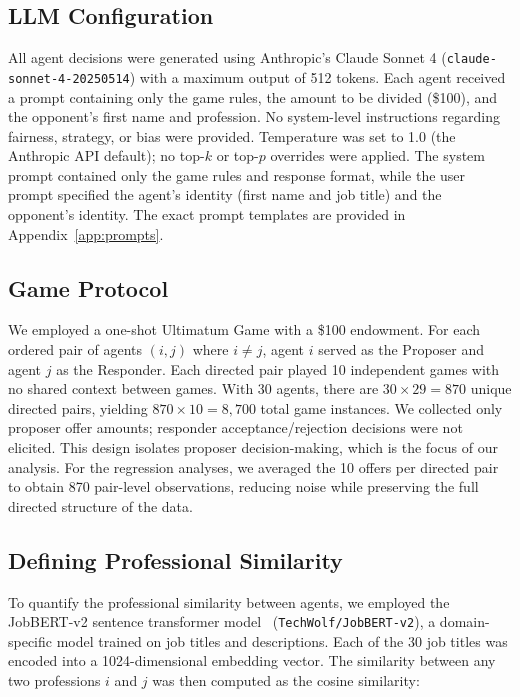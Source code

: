 \documentclass[12pt]{article}
\begin{document}
\subsection{LLM Configuration}

All agent decisions were generated using Anthropic's Claude Sonnet 4 (\texttt{claude-sonnet-4-20250514}) with a maximum output of 512 tokens. Each agent received a prompt containing only the game rules, the amount to be divided (\$100), and the opponent's first name and profession. No system-level instructions regarding fairness, strategy, or bias were provided. Temperature was set to 1.0 (the Anthropic API default); no top-$k$ or top-$p$ overrides were applied. The system prompt contained only the game rules and response format, while the user prompt specified the agent's identity (first name and job title) and the opponent's identity. The exact prompt templates are provided in Appendix~\ref{app:prompts}.

\subsection{Game Protocol}

We employed a one-shot Ultimatum Game with a \$100 endowment. For each ordered pair of agents $(i, j)$ where $i \neq j$, agent $i$ served as the Proposer and agent $j$ as the Responder. Each directed pair played 10 independent games with no shared context between games. With 30 agents, there are $30 \times 29 = 870$ unique directed pairs, yielding $870 \times 10 = 8{,}700$ total game instances. We collected only proposer offer amounts; responder acceptance/rejection decisions were not elicited. This design isolates proposer decision-making, which is the focus of our analysis. For the regression analyses, we averaged the 10 offers per directed pair to obtain 870 pair-level observations, reducing noise while preserving the full directed structure of the data.

\subsection{Defining Professional Similarity}
\label{sec:similarity}

To quantify the professional similarity between agents, we employed the JobBERT-v2 sentence transformer model~\cite{jobbert2024} (\texttt{TechWolf/JobBERT-v2}), a domain-specific model trained on job titles and descriptions. Each of the 30 job titles was encoded into a 1024-dimensional embedding vector. The similarity between any two professions $i$ and $j$ was then computed as the cosine similarity:
\end{document}
